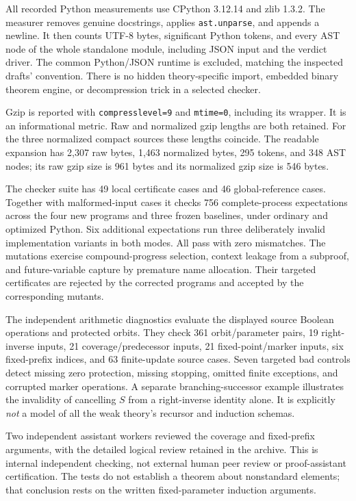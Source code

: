 All recorded Python measurements use CPython 3.12.14 and zlib 1.3.2.
The measurer removes genuine docstrings, applies \texttt{ast.unparse},
and appends a newline. It then counts UTF-8 bytes, significant Python
tokens, and every AST node of the whole standalone module, including
JSON input and the verdict driver. The common Python/JSON runtime is
excluded, matching the inspected drafts' convention. There is no hidden
theory-specific import, embedded binary theorem engine, or decompression
trick in a selected checker.

Gzip is reported with \texttt{compresslevel=9} and \texttt{mtime=0},
including its wrapper. It is an informational metric. Raw and normalized
gzip lengths are both retained. For the three normalized compact sources
these lengths coincide. The readable expansion has 2,307 raw bytes,
1,463 normalized bytes, 295 tokens, and 348 AST nodes; its raw gzip size
is 961 bytes and its normalized gzip size is 546 bytes.

The checker suite has 49 local certificate cases and 46 global-reference
cases. Together with malformed-input cases it checks 756 complete-process
expectations across the four new programs and three frozen baselines,
under ordinary and optimized Python. Six additional expectations run
three deliberately invalid implementation variants in both modes. All pass with zero
mismatches. The mutations exercise compound-progress selection, context
leakage from a subproof, and future-variable capture by premature name
allocation. Their targeted certificates are rejected by the
corrected programs and accepted by the corresponding mutants.

The independent arithmetic diagnostics evaluate the displayed source
Boolean operations and protected orbits. They check 361 orbit/parameter
pairs, 19 right-inverse inputs, 21 coverage/predecessor inputs, 21
fixed-point/marker inputs, six fixed-prefix indices, and 63 finite-update
source cases. Seven targeted bad controls detect missing zero protection,
missing stopping, omitted finite exceptions, and corrupted marker
operations. A separate branching-successor example illustrates the
invalidity of cancelling $S$ from a right-inverse identity alone. It is
explicitly \emph{not} a model of all the weak theory's recursor and
induction schemas.

Two independent assistant workers reviewed the coverage and fixed-prefix
arguments, with the detailed logical review retained in the archive.
This is internal independent checking, not external human peer review
or proof-assistant certification. The tests do not establish a theorem
about nonstandard elements; that conclusion rests on the written
fixed-parameter induction arguments.

